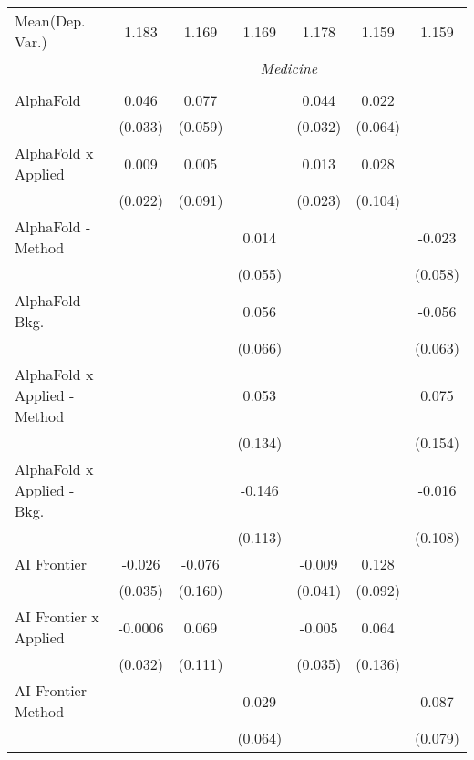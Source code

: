 \begin{tabular}{lcccccc}
Mean(Dep. Var.) & 1.183 & 1.169 & 1.169 & 1.178 & 1.159 & 1.159 \\
 & \multicolumn{6}{c}{\textit{Medicine}} \\ \\
   AlphaFold                      & 0.046   & 0.077   &         & 0.044   & 0.022   &   \\   
                                  & (0.033) & (0.059) &         & (0.032) & (0.064) &   \\   
   AlphaFold x Applied            & 0.009   & 0.005   &         & 0.013   & 0.028   &   \\   
                                  & (0.022) & (0.091) &         & (0.023) & (0.104) &   \\   
   AlphaFold - Method             &         &         & 0.014   &         &         & -0.023\\   
                                  &         &         & (0.055) &         &         & (0.058)\\   
   AlphaFold - Bkg.               &         &         & 0.056   &         &         & -0.056\\   
                                  &         &         & (0.066) &         &         & (0.063)\\   
   AlphaFold x Applied - Method   &         &         & 0.053   &         &         & 0.075\\   
                                  &         &         & (0.134) &         &         & (0.154)\\   
   AlphaFold x Applied - Bkg.     &         &         & -0.146  &         &         & -0.016\\   
                                  &         &         & (0.113) &         &         & (0.108)\\   
   AI Frontier                    & -0.026  & -0.076  &         & -0.009  & 0.128   &   \\   
                                  & (0.035) & (0.160) &         & (0.041) & (0.092) &   \\   
   AI Frontier x Applied          & -0.0006 & 0.069   &         & -0.005  & 0.064   &   \\   
                                  & (0.032) & (0.111) &         & (0.035) & (0.136) &   \\   
   AI Frontier - Method           &         &         & 0.029   &         &         & 0.087\\   
                                  &         &         & (0.064) &         &         & (0.079)\\   

\end{tabular}
